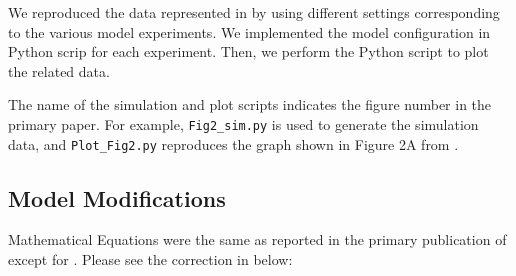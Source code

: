 \documentclass[fleqn,10pt]{physiome}
\begin{document}
We reproduced the data represented in \citet[Figures 2A, 3A, 4A, 6(A and B) \& 8A ]{imtiaz2002theoretical} by using different settings corresponding to the various model experiments. We implemented the model configuration in Python scrip for each experiment. Then, we perform the Python script to plot the related data.

The name of the simulation and plot scripts indicates the figure number in the primary paper. For example,
\texttt{Fig2\_sim.py} is used to generate the simulation data, and \texttt{Plot\_Fig2.py} reproduces the graph shown in Figure 2A from \citep{imtiaz2002theoretical}.

\subsection{Model Modifications }
\label{Parameter_Values}

Mathematical Equations were the same as reported in the primary publication of \citet{imtiaz2002theoretical} except for \cite[Equations 3, 7, and 9]{imtiaz2002theoretical}. Please see the correction in below:
\end{document}
